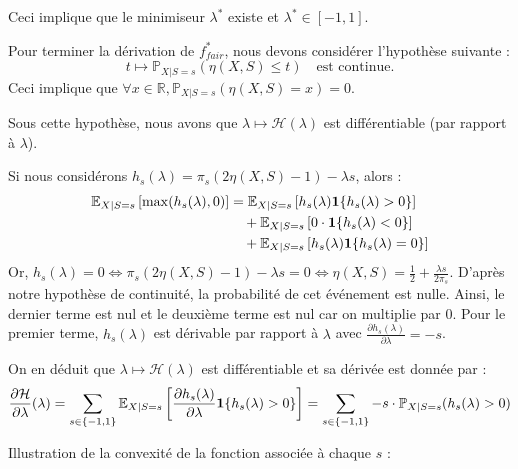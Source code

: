 Ceci implique que le minimiseur $\lambda^*$ existe et $\lambda^* \in [-1, 1]$.

Pour terminer la dérivation de $f^*_{fair}$, nous devons considérer l'hypothèse suivante :
\begin{equation}
    t \mapsto \mathbb{P}_{X|S=s}(\eta(X,S) \le t) \quad \text{est continue.}
\end{equation}
Ceci implique que $\forall x \in \mathbb{R}, \mathbb{P}_{X|S=s}(\eta(X,S) = x) = 0$.

Sous cette hypothèse, nous avons que $\lambda \mapsto \mathcal{H}(\lambda)$ est différentiable (par rapport à $\lambda$).

Si nous considérons $h_s(\lambda) = \pi_s (2\eta(X,S) - 1) - \lambda s$, alors :
\begin{align*}
    \mathbb{E}_{X|S=s} \left[ \max(h_s(\lambda), 0) \right] &= \mathbb{E}_{X|S=s} \left[ h_s(\lambda) \mathbf{1}\{h_s(\lambda) > 0\} \right] \\
    &\quad + \mathbb{E}_{X|S=s} \left[ 0 \cdot \mathbf{1}\{h_s(\lambda) < 0\} \right] \\
    &\quad + \mathbb{E}_{X|S=s} \left[ h_s(\lambda) \mathbf{1}\{h_s(\lambda) = 0\} \right]
\end{align*}
Or, $h_s(\lambda) = 0 \iff \pi_s (2\eta(X,S) - 1) - \lambda s = 0 \iff \eta(X,S) = \frac{1}{2} + \frac{\lambda s}{2\pi_s}$.
D'après notre hypothèse de continuité, la probabilité de cet événement est nulle.
Ainsi, le dernier terme est nul et le deuxième terme est nul car on multiplie par 0.
Pour le premier terme, $h_s(\lambda)$ est dérivable par rapport à $\lambda$ avec $\frac{\partial h_s(\lambda)}{\partial \lambda} = -s$.

On en déduit que $\lambda \mapsto \mathcal{H}(\lambda)$ est différentiable et sa dérivée est donnée par :
\begin{equation}
    \frac{\partial \mathcal{H}}{\partial \lambda}(\lambda) = \sum_{s \in \{-1, 1\}} \mathbb{E}_{X|S=s} \left[ \frac{\partial h_s(\lambda)}{\partial \lambda} \mathbf{1}\{h_s(\lambda) > 0\} \right] = \sum_{s \in \{-1, 1\}} -s \cdot \mathbb{P}_{X|S=s}(h_s(\lambda) > 0)
\end{equation}

Illustration de la convexité de la fonction associée à chaque $s$ :

\begin{center}
\end{center}

